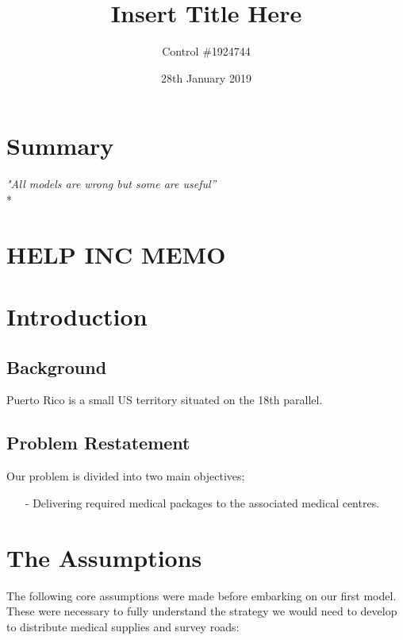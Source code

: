 \documentclass[a4paper,12pt]{article}
\begin{document}
\title{Insert Title Here}
\author{Control \#1924744}
\date{28th January 2019}
\maketitle
\newpage


\section*{\hfil Summary\hfil}
\begin{center}
\textit{"All models are wrong but some are useful''} \\*
\end{center}

\newpage

\section*{\hfil HELP INC MEMO\hfil}
\newpage


\tableofcontents
\newpage
{}


\newpage


\section{Introduction}
\subsection{Background}
Puerto Rico is a small US territory situated on the 18th parallel.
\subsection{Problem Restatement}
Our problem is divided into two main objectives;
\begin{itemize}
\item[-]Delivering required medical packages to the associated medical centres.
\end{itemize}


\section{The Assumptions}
The following core assumptions were made before embarking on our first model. These were necessary to fully understand the strategy we would
need to develop to distribute medical supplies and survey roads:
\end{document}

